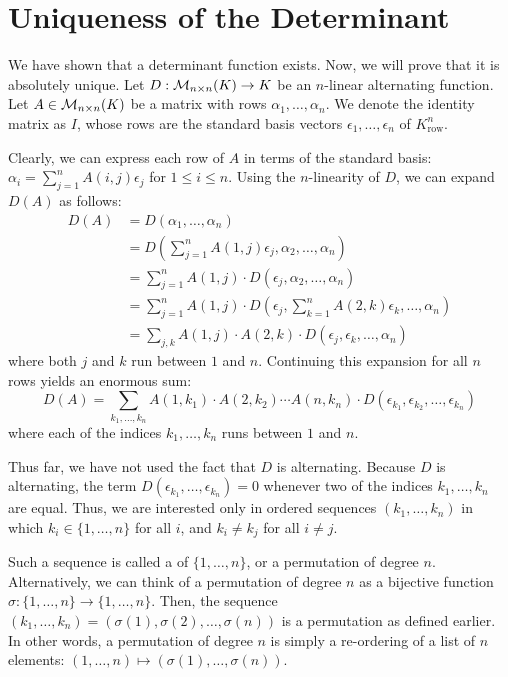 \section{Uniqueness of the Determinant}

We have shown that a determinant function exists. Now, we will prove that it is absolutely unique. Let $D : \mathcal{M}_{n \times n}(K) \to K$ be an $n$-linear alternating function.
Let $A \in \mathcal{M}_{n \times n}(K)$ be a matrix with rows $\alpha_1, \dots, \alpha_n$. We denote the identity matrix as $I$, whose rows are the standard basis vectors $\epsilon_1, \dots, \epsilon_n$ of $K^n_{\text{row}}$.

Clearly, we can express each row of $A$ in terms of the standard basis: $\alpha_i = \sum_{j=1}^n A(i,j)\epsilon_j$ for $1 \le i \le n$. Using the $n$-linearity of $D$, we can expand $D(A)$ as follows:
\begin{align*}
  D(A) &= D(\alpha_1, \dots, \alpha_n) \\
  &= D\left(\sum_{j=1}^n A(1,j)\epsilon_j, \alpha_2, \dots, \alpha_n\right) \\
  &= \sum_{j=1}^n A(1,j) \cdot D(\epsilon_j, \alpha_2, \dots, \alpha_n) \\
  &= \sum_{j=1}^n A(1,j) \cdot D\left(\epsilon_j, \sum_{k=1}^n A(2,k)\epsilon_k, \dots, \alpha_n\right) \\
  &= \sum_{j,k} A(1,j) \cdot A(2,k) \cdot D(\epsilon_j, \epsilon_k, \dots, \alpha_n)
\end{align*}
where both $j$ and $k$ run between $1$ and $n$. Continuing this expansion for all $n$ rows yields an enormous sum:
\[
D(A) = \sum_{k_1, \dots, k_n} A(1,k_1) \cdot A(2,k_2) \cdots A(n,k_n) \cdot D(\epsilon_{k_1}, \epsilon_{k_2}, \dots, \epsilon_{k_n})
\]
where each of the indices $k_1, \dots, k_n$ runs between $1$ and $n$.

Thus far, we have not used the fact that $D$ is alternating. Because $D$ is alternating, the term $D(\epsilon_{k_1}, \dots, \epsilon_{k_n}) = 0$ whenever two of the indices $k_1, \dots, k_n$ are equal. Thus, we are interested only in ordered sequences $(k_1, \dots, k_n)$ in which $k_i \in \{1, \dots, n\}$ for all $i$, and $k_i \neq k_j$ for all $i \neq j$.

Such a sequence is called a  of $\{1, \dots, n\}$, or a permutation of degree $n$. Alternatively, we can think of a permutation of degree $n$ as a bijective function $\sigma : \{1, \dots, n\} \to \{1, \dots, n\}$. Then, the sequence $(k_1, \dots, k_n) = (\sigma(1), \sigma(2), \dots, \sigma(n))$ is a permutation as defined earlier. In other words, a permutation of degree $n$ is simply a re-ordering of a list of $n$ elements: $(1, \dots, n) \mapsto (\sigma(1), \dots, \sigma(n))$.

